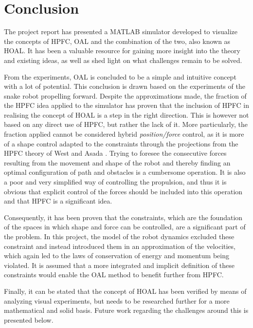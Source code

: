 \chapter{Conclusion}\label{outlook}

The project report has presented a MATLAB simulator developed to visualize the concepts of HPFC, OAL and the combination of the two, also known as HOAL. It has been a valuable resource for gaining more insight into the theory and existing ideas, as well as shed light on what challenges remain to be solved.

From the experiments, OAL is concluded to be a simple and intuitive concept with a lot of potential. This conclusion is drawn based on the experiments of the snake robot propelling forward.
Despite the approximations made, the fraction of the HPFC idea applied to the simulator has proven that the inclusion of HPFC in realising the concept of HOAL is a step in the right direction. This is however not based on any direct use of HPFC, but rather the lack of it. More particularly, the fraction applied cannot be considered hybrid \textit{position/force} control, as it is more of a shape control adapted to the constraints through the projections from the HPFC theory of West and Asada \cite{west1985method}.
Trying to foresee the consecutive forces resulting from the movement and shape of the robot and thereby finding an optimal configuration of path and obstacles is a cumbersome operation. It is also a poor and very simplified way of controlling the propulsion, and thus it is obvious that explicit control of the forces should be included into this operation and that HPFC is a significant idea.

Consequently, it has been proven that the constraints, which are the foundation of the spaces in which shape and force can be controlled, are a significant part of the problem. In this project, the model of the robot dynamics excluded these constraint and instead introduced them in an approximation of the velocities, which again led to the laws of conservation of energy and momentum being violated. It is assumed that a more integrated and implicit definition of these constraints would enable the OAL method to benefit further from HPFC.


Finally, it can be stated that the concept of HOAL has been verified by means of analyzing visual experiments, but needs to be researched further for a more mathematical and solid basis. Future work regarding the challenges around this is presented below.

